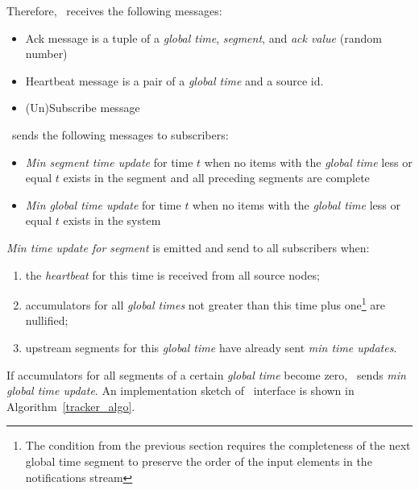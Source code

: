 Therefore, \tracker\ receives the following messages:
\begin{itemize}
    \item Ack message is a tuple of a \textit{global time}, \textit{segment}, and \textit{ack value} (random number)
    \item Heartbeat message is a pair of a \textit{global time} and a source id.
    \item (Un)Subscribe message
\end{itemize}


\tracker\ sends the following messages to subscribers:
\begin{itemize}
    \item \textit{Min segment time update} for time $t$ when no items with the \textit{global time} less or equal $t$ exists in the segment and all preceding segments are complete
    \item \textit{Min global time update} for time $t$ when no items with the \textit{global time} less or equal $t$ exists in the system
\end{itemize}

\textit{Min time update for segment} is emitted and send to all subscribers when:
\begin{enumerate}
    \item the \textit{heartbeat} for this time is received from all source nodes;
    \item accumulators for all \textit{global times} not greater than this time plus one\footnote{The condition from the previous section requires the completeness of the next global time segment to preserve the order of the input elements in the notifications stream} are nullified;
    \item upstream segments for this \textit{global time} have already sent \textit{min time updates}.
\end{enumerate}
If accumulators for all segments of a certain \textit{global time} become zero, \tracker\ sends \textit{min global time update}. An implementation sketch of \tracker\ interface is shown in Algorithm~\ref{tracker_algo}.

